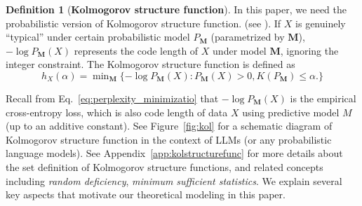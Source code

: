 \documentclass[11pt]{article}
\theoremstyle{plain}
\theoremstyle{definition}
\newtheorem{definition}[theorem]{Definition}
\newcommand{\Model}{\boldsymbol{M}}
\begin{document}
\begin{definition}[\textbf{Kolmogorov structure function}]
In this paper, we need the probabilistic version of 
Kolmogorov structure function.
(see \cite{grunwald2003kolmogorov}).
If \(X\) is genuinely “typical” under certain probabilistic model 
\(P_{\Model}\) (parametrized by $\Model$), 
\(-\log P_{\Model}(X)\) represents the code length
of $X$ under model $\Model$, ignoring the integer constraint.
The Kolmogorov structure function is defined as
$$
h_X(\alpha) = \min\nolimits_{\Model}
\{
-\log P_{\Model}(X) : P_{\Model}(X) >0, K(P_{\Model})\leq \alpha.
\}
$$
\end{definition}

\noindent
Recall from Eq.~\eqref{eq:perplexity_minimizatio}
that $-\log P_{\Model}(X)$ is the empirical cross-entropy loss, which is also code length of data $X$ using predictive model $M$(up to an additive constant).
See Figure~\ref{fig:kol}
for a schematic diagram of Kolmogorov structure function
in the context of LLMs (or any probabilistic language models).
See Appendix~\ref{app:kolstructurefunc} for more details
about the set definition of Kolmogorov structure functions, 
and related concepts
including {\em random deficiency}, {\em minimum sufficient statistics}.
We explain several key aspects that motivate
our theoretical modeling in this paper.
\end{document}
